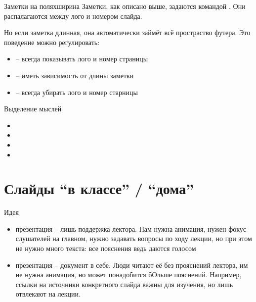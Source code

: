 \documentclass[12pt, aspectratio=43]{beamer}
\begin{document}
    \begin{frame}{Заметки на полях}{ширина}\relax
        Заметки, как описано выше, задаются командой \texttt{\string\cscfootnote}. Они распалагаются между лого и номером слайда.
        
        Но если заметка длинная, она автоматически займёт всё простраство футера. Это поведение можно регулировать:
        \begin{itemize}
            \item \texttt{\string{}} -- всегда показывать лого и номер страницы
            \item \texttt{\string{}} -- иметь зависимость от длины заметки
            \item \texttt{\string{}} -- всегда убирать лого и номер старницы
             
        \end{itemize}
    \end{frame}
    
    \begin{frame}{Выделение мыслей}\relax
         \begin{itemize}
            \item {}
            \item {}
            \item {}
            \item {}
         \end{itemize}
    \end{frame}
    
    \section{Слайды ``в классе'' / ``дома''}
    
    \begin{frame}{Идея}\relax
        \begin{itemize}
            \item {} презентация -- лишь поддержка лектора. Нам нужна анимация, нужен фокус слушателей на главном, нужно задавать вопросы по ходу лекции, но при этом не нужно много текста: все пояснения ведь даются голосом
            \item {} презентация -- документ в себе. Люди читают её без прояснений лектора, им не нужна анимация, но может понадобится бОльше пояснений. Например, ссылки на источники конкретного слайда важны для изучения, но лишь отвлекают на лекции.
             
        \end{itemize}
    \end{frame}
        
\end{document}
